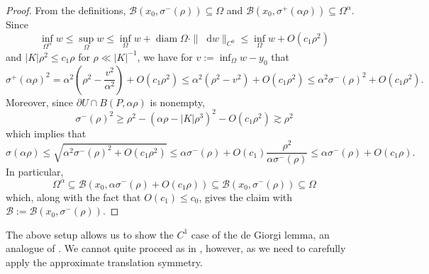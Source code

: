 \documentclass[reqno,11pt]{amsart}
\DeclareMathOperator{\diam}{diam}
\newcommand*\dif{\mathop{}\!\mathrm{d}}
\theoremstyle{definition}
\numberwithin{equation}{section}
\begin{document}
\begin{proof}
From the definitions, $\mathscr B(x_0, \sigma^-(\rho)) \subseteq \Omega$ and $\mathscr B(x_0, \sigma^+(\alpha \rho)) \subseteq \Omega^\alpha$.
Since
$$\inf_{\Omega^\alpha} w \leq \sup_\Omega w \leq \inf_\Omega w + \diam \Omega \cdot \|\dif w\|_{C^0} \leq \inf_\Omega w + O(c_1 \rho^2)$$
and $|K| \rho^2 \leq c_1 \rho$ for $\rho \ll |K|^{-1}$, we have for $v := \inf_\Omega w - y_0$ that
$$\sigma^+(\alpha \rho)^2 = \alpha^2\left(\rho^2 - \frac{v^2}{\alpha^2}\right) + O(c_1 \rho^2) \leq \alpha^2(\rho^2 - v^2) + O(c_1 \rho^2) \leq \alpha^2 \sigma^-(\rho)^2 + O(c_1 \rho^2).$$
Moreover, since $\partial U \cap B(P, \alpha \rho)$ is nonempty,
$$\sigma^-(\rho)^2 \geq \rho^2 - (\alpha \rho - |K|\rho^3)^2 - O(c_1 \rho^2) \gtrsim \rho^2$$
which implies that
$$\sigma(\alpha \rho) \leq \sqrt{\alpha^2 \sigma^-(\rho)^2 + O(c_1 \rho^2)} \leq \alpha \sigma^-(\rho) + O(c_1) \frac{\rho^2}{\alpha \sigma^-(\rho)} \leq \alpha \sigma^-(\rho) + O(c_1 \rho).$$
In particular,
$$\Omega^\alpha \subseteq \mathscr B(x_0, \alpha \sigma^-(\rho) + O(c_1 \rho)) \subseteq \mathscr B(x_0, \sigma^-(\rho)) \subseteq \Omega$$
which, along with the fact that $O(c_1) \leq c_0$, gives the claim with $\mathscr B := \mathscr B(x_0, \sigma^-(\rho))$.
\end{proof}

The above setup allows us to show the $C^1$ case of the de Giorgi lemma, an analogue of \cite[Lemma 6.4]{Giusti77}.
We cannot quite proceed as in \cite{Giusti77}, however, as we need to carefully apply the approximate translation symmetry.
\end{document}
